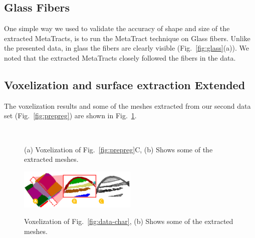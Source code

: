 \subsection{Glass Fibers}
One simple way we used to validate the accuracy of shape and size of the extracted MetaTracts, is to run the MetaTract technique on Glass fibers.
Unlike the presented data, in glass the fibers are clearly visible (Fig.~\ref{fig:glass}(a)). We noted that the extracted MetaTracts closely followed the fibers in the data.
\subsection{Voxelization and surface extraction Extended}
The voxelization results and some of the meshes extracted from our second data set (Fig.~\ref{fig:prepreg}) are shown in Fig.~\ref{fig:vox_extended}.
\begin{figure}[h]
\centering
{}
\\
\caption{(a) Voxelization of Fig.~\ref{fig:prepreg}C, (b) Shows some of the extracted meshes.}
\label{fig:vox_extended}
\end{figure}
\begin{figure}[h]
\centering
\includegraphics[width=0.5\textwidth]{imagesMT2014/UserStudy/vol_crop16}
\\
\caption{ Voxelization of Fig.~\ref{fig:data-char}, (b) Shows some of the extracted meshes.}
\label{fig:vox_extended_crop16}
\end{figure}

